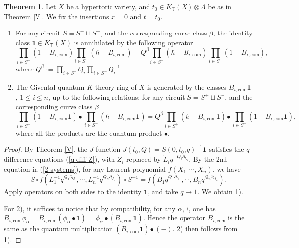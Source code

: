 \documentclass[10pt]{amsart}
\theoremstyle{definition}
\def\TT{\mathbb{T}}
\newcommand{\bone}{\mathbf{1}}
\newcommand{\com}{\mathrm{com}}
\newcommand{\bT}{\mathsf{T}}
\theoremstyle{definition}
\numberwithin{equation}{section}
\theoremstyle{Theorem}
\newtheorem{Theorem}[Definition]{Theorem}
\begin{document}
\begin{Theorem} \label{GivQK-relation}
Let $X$ be a hypertoric variety, and $t_0 \in K_\TT (X) \otimes \Lambda$ be as in Theorem \ref{V}. We fix the insertions $x = 0$ and $t = t_0$.

\begin{enumerate}[1)]
	
		\setlength{\parskip}{1ex}
	
\item For any circuit $S = S^+\sqcup S^-$, and the corresponding curve class $\beta$, the identity class $\bone \in K_\bT (X)$ is annihilated by the following operator
$$
\prod_{i\in S^+} ( 1 - B_{i, \com}) \prod_{i\in S^-} (\hbar - B_{i, \com} ) - Q^\beta \prod_{i\in S^+} (\hbar - B_{i, \com} ) \prod_{i\in S^-} (1 - B_{i, \com}),
$$
where $Q^\beta := \prod_{i\in S^+} Q_i \prod_{i\in S^-} Q_i^{-1}$.

\item The Givental quantum $K$-theory ring of $X$ is generated by the classes $B_{i, \com} \bone$, $1\leq i\leq n$, up to the following relations: for any circuit $S = S^+\sqcup S^-$, and the corresponding curve class $\beta$
$$
\prod_{i\in S^+} ( 1 - B_{i, \com} \bone) \bullet \prod_{i\in S^-} (\hbar - B_{i, \com} \bone ) = Q^\beta \prod_{i\in S^+} (\hbar - B_{i, \com} \bone ) \bullet \prod_{i\in S^-} (1 - B_{i, \com} \bone ),
$$
where all the products are the quantum product $\bullet$.

\end{enumerate}

\end{Theorem}

\begin{proof}
By Theorem \ref{V}, the $J$-function $J(t_0, Q) = S(0, t_0, q)^{-1} \bone$ satisfies the $q$-difference equations (\ref{q-diff-Z}), with $Z_i$ replaced by $\widetilde L_i q^{-Q_i \partial_{Q_i}}$. By the 2nd equation in (\ref{2-systems}), for any Laurent polynomial $f(X_1, \cdots, X_n)$, we have
$$
S \circ f ( L_1^{-1} q^{Q_1 \partial_{Q_1}} , \cdots,  L_n^{-1} q^{Q_n \partial_{Q_n}} ) \circ S^{-1} = f(B_1 q^{Q_1 \partial_{Q_1}}, \cdots, B_n q^{Q_n \partial_{Q_n}} ).
$$
Apply operators on both sides to the identity $\bone$, and take $q\to 1$. We obtain 1).

For 2), it suffices to notice that by compatibility, for any $\alpha$, $i$, one has $B_{i, \com} \phi_\alpha = B_{i, \com} (\phi_\alpha \bullet \bone) = \phi_\alpha \bullet (B_{i, \com} \bone)$. Hence the operator $B_{i, \com}$ is the same as the quantum multiplication $(B_{i, \com} \bone) \bullet (-)$. 2) then follows from 1).
\end{proof}
\end{document}
